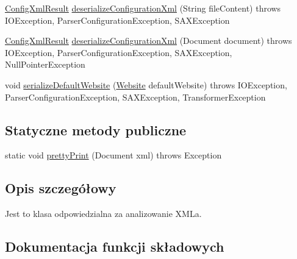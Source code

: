 \begin{DoxyCompactItemize}
\item 
\hyperlink{classpl_1_1edu_1_1uwb_1_1mobiuwb_1_1parsers_1_1xml_1_1parser_1_1_config_xml_result}{Config\+Xml\+Result} \hyperlink{classpl_1_1edu_1_1uwb_1_1mobiuwb_1_1parsers_1_1xml_1_1parser_1_1_x_m_l_parser_a109af99b1c94dd3e3aed3cb499d88b7b}{deserialize\+Configuration\+Xml} (String file\+Content)  throws I\+O\+Exception,             Parser\+Configuration\+Exception,             S\+A\+X\+Exception     
\item 
\hyperlink{classpl_1_1edu_1_1uwb_1_1mobiuwb_1_1parsers_1_1xml_1_1parser_1_1_config_xml_result}{Config\+Xml\+Result} \hyperlink{classpl_1_1edu_1_1uwb_1_1mobiuwb_1_1parsers_1_1xml_1_1parser_1_1_x_m_l_parser_a105e3006ca0018f307c5d7ce26f8e16f}{deserialize\+Configuration\+Xml} (Document document)  throws I\+O\+Exception,             Parser\+Configuration\+Exception,             S\+A\+X\+Exception,             Null\+Pointer\+Exception     
\item 
void \hyperlink{classpl_1_1edu_1_1uwb_1_1mobiuwb_1_1parsers_1_1xml_1_1parser_1_1_x_m_l_parser_a3943579fdd2b116c18b809b35e21472b}{serialize\+Default\+Website} (\hyperlink{classpl_1_1edu_1_1uwb_1_1mobiuwb_1_1parsers_1_1xml_1_1model_1_1_website}{Website} default\+Website)  throws I\+O\+Exception,             Parser\+Configuration\+Exception,             S\+A\+X\+Exception,             Transformer\+Exception     
\end{DoxyCompactItemize}
\subsection*{Statyczne metody publiczne}
\begin{DoxyCompactItemize}
\item 
static void \hyperlink{classpl_1_1edu_1_1uwb_1_1mobiuwb_1_1parsers_1_1xml_1_1parser_1_1_x_m_l_parser_afc710b02dc5ac7901d8f508f9333f60b}{pretty\+Print} (Document xml)  throws Exception     
\end{DoxyCompactItemize}


\subsection{Opis szczegółowy}
Jest to klasa odpowiedzialna za analizowanie X\+M\+L\textquotesingle{}a. 

\subsection{Dokumentacja funkcji składowych}
\hypertarget{classpl_1_1edu_1_1uwb_1_1mobiuwb_1_1parsers_1_1xml_1_1parser_1_1_x_m_l_parser_a844d291ff36027b48452724bec972975}{}
